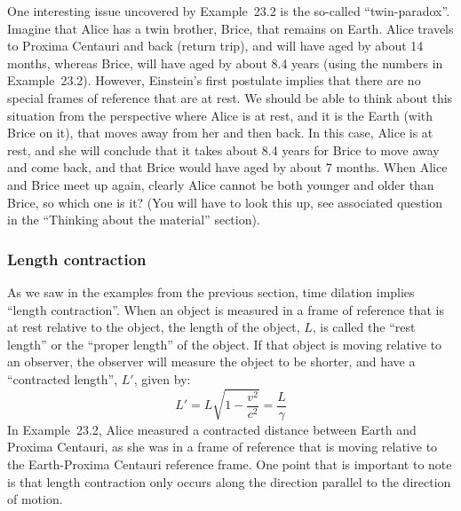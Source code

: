 One interesting issue uncovered by Example~23.2 is the so-called ``twin-paradox''. Imagine that Alice has a twin brother, Brice, that remains on Earth. Alice travels to Proxima Centauri and back (return trip), and will have aged by about 14 months, whereas Brice, will have aged by about 8.4 years (using the numbers in Example~23.2). However, Einstein's first postulate implies that there are no special frames of reference that are at rest. We should be able to think about this situation from the perspective where Alice is at rest, and it is the Earth (with Brice on it), that moves away from her and then back. In this case, Alice is at rest, and she will conclude that it takes about 8.4 years for Brice to move away and come back, and that Brice would have aged by about 7 months. When Alice and Brice meet up again, clearly Alice cannot be both younger and older than Brice, so which one is it? (You will have to look this up, see associated question in the ``Thinking about the material'' section).

\subsubsection{Length contraction}

As we saw in the examples from the previous section, time dilation implies ``length contraction''. When an object is measured in a frame of reference that is at rest relative to the object, the length of the object, $L$, is called the ``rest length'' or the ``proper length'' of the object. If that object is moving relative to an observer, the observer will measure the object to be shorter, and have a ``contracted length'', $L'$, given by:
\begin{equation}
\boxed{L'=L\sqrt{1-\frac{v^2}{c^2}} =\frac{L}{\gamma}}
\end{equation}
In Example~23.2, Alice measured a contracted distance between Earth and Proxima Centauri, as she was in a frame of reference that is moving relative to the Earth-Proxima Centauri reference frame. One point that is important to note is that length contraction only occurs along the direction parallel to the direction of motion.

